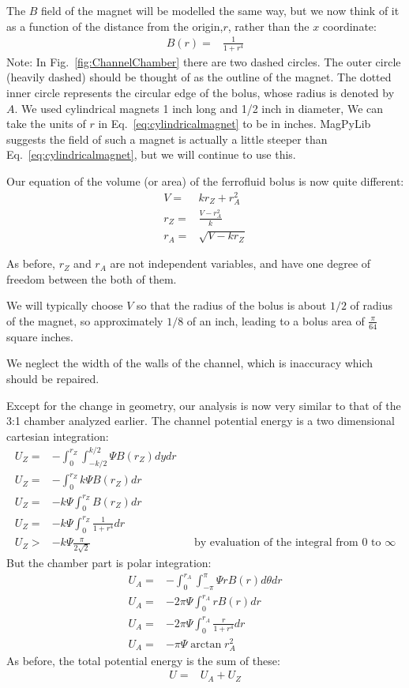 \documentclass{asme2ej}
\begin{document}
The $B$ field of the magnet will be modelled the same
way, but we now think of it as a function of the distance
from the origin,$r$, rather than the $x$ coordinate:
\begin{align}
  B(r) =& \frac{1}{1+r^4}
  \label{eq:cylindricalmagnet}
\end{align}
Note: In Fig.~\ref{fig:ChannelChamber} there are two dashed circles.
The outer circle (heavily dashed) should be thought of as the outline
of the magnet. The dotted inner circle represents the circular edge
of the bolus, whose radius is denoted by $A$.
We used cylindrical magnets 1 inch long and 1/2 inch in
diameter,
We can take the units of $r$ in Eq.~\ref{eq:cylindricalmagnet}
to be in inches.
MagPyLib suggests the field of such a magnet is
actually a little steeper than Eq.~\ref{eq:cylindricalmagnet},
but we will continue to use this.

Our equation of the volume (or area) of the ferrofluid bolus
is now quite different:
\begin{align}
  V = & k r_Z + r_A^2 \\
  r_Z = & \frac{V - r_A^2}{k} \\
  r_A = & \sqrt{V - k r_Z}
  \label{eqn:yvalue}
\end{align}

As before, $r_Z$ and $r_A$ are not independent variables,
and have one degree of freedom between the both of them.

We will typically choose $V$ so that the radius of
the bolus is about $1/2$ of radius of the magnet,
so approximately $1/8$ of an inch, leading
to a bolus area of $\frac{\pi}{64}$ square inches.

We neglect the width of the walls of the channel, which is inaccuracy which should be repaired.

Except for the change in geometry, our analysis is now very similar
to that of the 3:1 chamber analyzed earlier.
The channel potential energy is a two dimensional cartesian integration:
\begin{align}
  U_Z = & -\int_{0}^{r_Z} \int_{-k/2}^{k/2} \Psi B(r_Z) dy dr \\
  U_Z = & -\int_{0}^{r_Z} k \Psi B(r_Z) dr \\
  U_Z = & -k \Psi \int_{0}^{r_Z} B(r_Z) dr \\
  U_Z = & -k \Psi \int_{0}^{r_Z} \frac{1}{1+r^4} dr \\
  U_Z > & -k \Psi \frac{\pi}{2\sqrt{2}} && \text{by evaluation of the integral from $0$ to $\infty$}
\end{align}
But the chamber part is polar integration:
\begin{align}
  U_A = &  -\int_0^{r_A} \int_{-\pi}^{\pi} \Psi r B(r) d\theta dr \\
  U_A = &  -2 \pi \Psi \int_0^{r_A} r B(r) dr \\
  U_A = & - 2 \pi \Psi \int_{0}^{r_A} \frac{r}{1+r^4} dr \\
  U_A = & - \pi \Psi \arctan{r_A^2}
\end{align}
As before, the total potential energy is the sum of these:
\begin{align}
  U = & U_A + U_Z
\end{align}
\end{document}
